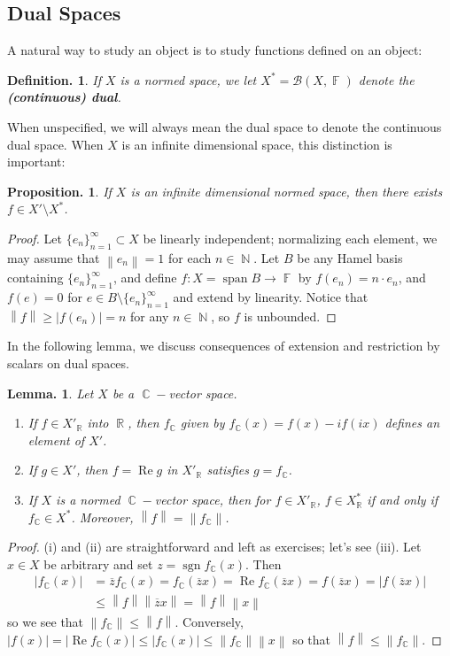 \documentclass[11pt, a4paper]{memoir}
\DeclareMathOperator{\N}{{\mathbb{N}}}
\DeclareMathOperator{\R}{{\mathbb{R}}}
\DeclareMathOperator{\C}{{\mathbb{C}}}
\DeclareMathOperator{\F}{{\mathbb{F}}}
\newcommand{\norm}[1]{\ensuremath{\left\lVert#1\right\rVert}}
\theoremstyle{change}
\newtheorem{lemma}[theorem]{Lemma.}
\newtheorem{proposition}[theorem]{Proposition.}
\theoremstyle{plain}
\theoremstyle{nonumberplain}
\newtheorem{definition}{Definition.}
\newtheorem{proof}{Proof}
\DeclareMathOperator{\spn}{span}
\DeclareMathOperator{\sgn}{sgn}
\renewcommand{\Re}{\ensuremath{\operatorname{Re}}}
\numberwithin{equation}{section}
\begin{document}
\subsection{Dual Spaces}
A natural way to study an object is to study functions defined on an object:
\begin{definition}
    If $X$ is a normed space, we let $X^*=\mathcal{B}(X,\F)$ denote the \textbf{(continuous) dual}.
\end{definition}
When unspecified, we will always mean the dual space to denote the continuous dual space.
When $X$ is an infinite dimensional space, this distinction is important:
\begin{proposition}
    If $X$ is an infinite dimensional normed space, then there exists $f\in X'\setminus X^*$.
\end{proposition}
\begin{proof}
    Let $\{e_n\}_{n=1}^\infty\subset X$ be linearly independent; normalizing each element, we may assume that $\norm{e_n}=1$ for each $n\in\N$.
    Let $B$ be any Hamel basis containing $\{e_n\}_{n=1}^\infty$, and define $f:X=\spn B\to\F$ by $f(e_n)=n\cdot e_n$, and $f(e)=0$ for $e\in B\setminus\{e_n\}_{n=1}^\infty$ and extend by linearity.
    Notice that $\norm{f}\geq|f(e_n)|=n$ for any $n\in\N$, so $f$ is unbounded.
\end{proof}
In the following lemma, we discuss consequences of extension and restriction by scalars on dual spaces.
\begin{lemma}\label{l:dual-cpx}
    Let $X$ be a $\C-$vector space.
    \begin{enumerate}[nl,r]
        \item If $f\in X'_{\R}$ into $\R$, then $f_{\C}$ given by $f_{\C}(x)=f(x)-if(ix)$ defines an element of $X'$.
        \item If $g\in X'$, then $f=\Re g$ in $X'_{\R}$ satisfies $g=f_{\C}$.
        \item If $X$ is a normed $\C-$vector space, then for $f\in X'_{\R}$, $f\in X^*_{\R}$ if and only if $f_{\C}\in X^*$.
            Moreover, $\norm{f}=\norm{f_{\C}}$.
    \end{enumerate}
\end{lemma}
\begin{proof}
    (i) and (ii) are straightforward and left as exercises; let's see (iii).
    Let $x\in X$ be arbitrary and set $z=\sgn f_{\C}(x)$.
    Then
    \begin{align*}
        |f_{\C}(x)|&=\overline{z}f_{\C}(x)=f_{\C}(\overline{z}x)=\Re f_{\C}(\overline{z}x)=f(\overline{z}x)=|f(\overline{z}x)|\\
                   &\leq\norm{f}\norm{\overline{z}x}=\norm{f}\norm{x}
    \end{align*}
    so we see that $\norm{f_{\C}}\leq\norm{f}$.
    Conversely, $|f(x)|=|\Re f_{\C}(x)|\leq|f_{\C}(x)|\leq\norm{f_{\C}}\norm{x}$ so that $\norm{f}\leq\norm{f_{\C}}$.
\end{proof}
\end{document}
